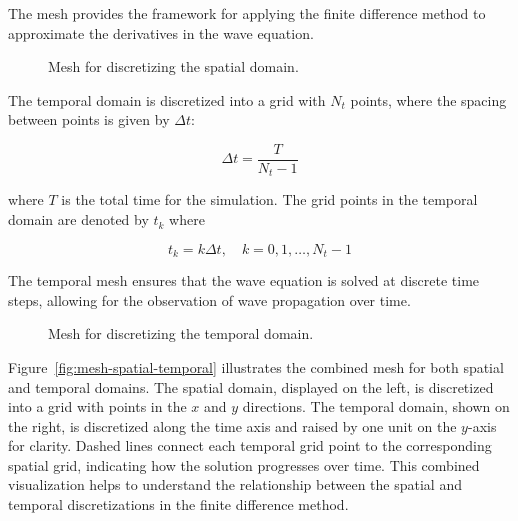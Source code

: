 \documentclass{article}
\begin{document}
The mesh provides the framework for applying the finite difference method to approximate the derivatives in the wave equation.

\begin{figure}[h]
    \centering
    \caption{Mesh for discretizing the spatial domain.}
    \label{fig:mesh-spatial}
\end{figure}

The temporal domain is discretized into a grid with \(N_t\) points, where the spacing between points is given by \(\Delta t\):

\[
\Delta t = \frac{T}{N_t-1}
\]

where \(T\) is the total time for the simulation. The grid points in the temporal domain are denoted by \(t_k\) where

\[
t_k = k \Delta t, \quad k = 0, 1, \ldots, N_t-1
\]

The temporal mesh ensures that the wave equation is solved at discrete time steps, allowing for the observation of wave propagation over time.

\begin{figure}[h]
    \centering
    \caption{Mesh for discretizing the temporal domain.}
    \label{fig:mesh-temporal}
\end{figure}

Figure~\ref{fig:mesh-spatial-temporal} illustrates the combined mesh for both
spatial and temporal domains. The spatial domain, displayed on the left, is
discretized into a grid with points in the \(x\) and \(y\) directions. The
temporal domain, shown on the right, is discretized along the time axis and
raised by one unit on the \(y\)-axis for clarity. Dashed lines connect each
temporal grid point to the corresponding spatial grid, indicating how the
solution progresses over time. This combined visualization helps to understand
the relationship between the spatial and temporal discretizations in the finite
difference method.
\end{document}

